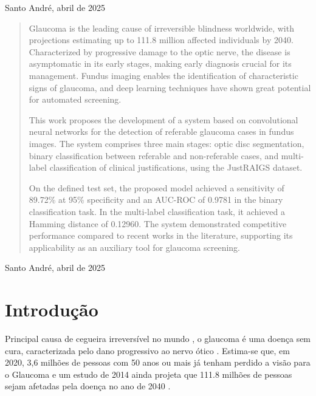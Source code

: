 \documentclass[12pt]{article}
\begin{document}
\begin{center}
Santo André, abril de 2025
\end{center}

\newpage


\begin{center}
\end{center}

\begin{quote}

Glaucoma is the leading cause of irreversible blindness worldwide, with projections estimating up to 111.8 million affected individuals by 2040. Characterized by progressive damage to the optic nerve, the disease is asymptomatic in its early stages, making early diagnosis crucial for its management. Fundus imaging enables the identification of characteristic signs of glaucoma, and deep learning techniques have shown great potential for automated screening.

This work proposes the development of a system based on convolutional neural networks for the detection of referable glaucoma cases in fundus images. The system comprises three main stages: optic disc segmentation, binary classification between referable and non-referable cases, and multi-label classification of clinical justifications, using the JustRAIGS dataset.

On the defined test set, the proposed model achieved a sensitivity of 89.72\% at 95\% specificity and an AUC-ROC of 0.9781 in the binary classification task. In the multi-label classification task, it achieved a Hamming distance of 0.12960. The system demonstrated competitive performance compared to recent works in the literature, supporting its applicability as an auxiliary tool for glaucoma screening.

\end{quote}

\begin{center}
Santo André, abril de 2025
\end{center}

\newpage

\tableofcontents

\newpage


\section{Introdução}
\label{sec:introducao}

Principal causa de cegueira irreversível no mundo \cite{steinmetz_causes_2021}, o glaucoma é uma doença sem cura, caracterizada pelo dano progressivo ao nervo ótico \cite{who_2019}. Estima-se que, em 2020, 3,6 milhões de pessoas com 50 anos ou mais já tenham perdido a visão para o Glaucoma \cite{steinmetz_causes_2021} e um estudo de 2014 ainda projeta que 111.8 milhões de pessoas sejam afetadas pela doença no ano de 2040 \cite{tham_global_2014}.
\end{document}
